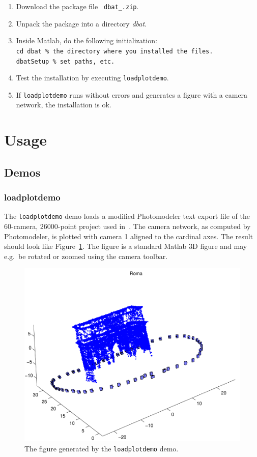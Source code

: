 \documentclass{article}
\begin{document}
\begin{enumerate}
\item Download the package file {\tt
  \verb+dbat_+\dbatversion\verb+.zip+}.
\item Unpack the package into a directory \emph{dbat}.
\item \label{step:dbatInit}
Inside Matlab, do the following initialization:\\
\verb+cd dbat % the directory where you installed the files.+\\
\verb+dbatSetup % set paths, etc.+
\item Test the installation by executing \texttt{loadplotdemo}.
\item If \texttt{loadplotdemo} runs without errors and generates a
  figure with a camera network, the installation is ok.
\end{enumerate}

\section{Usage}

\subsection{Demos}

\subsubsection{loadplotdemo}

The \verb+loadplotdemo+ demo loads a modified Photomodeler text export
file of the 60-camera, 26000-point project used
in~\cite{Borlin2013:Bundle}. The camera network, as computed by
Photomodeler, is plotted with camera 1 aligned to the cardinal axes.
The result should look like Figure~\ref{fig:roma}. The figure is a
standard Matlab 3D figure and may e.g.\ be rotated or zoomed using the
camera toolbar.

\begin{figure}
  \centering
  \includegraphics[width=0.6\hsize]{ill/roma}
  \caption{The figure generated by the \texttt{loadplotdemo} demo.}
  \label{fig:roma}
\end{figure}
\end{document}
